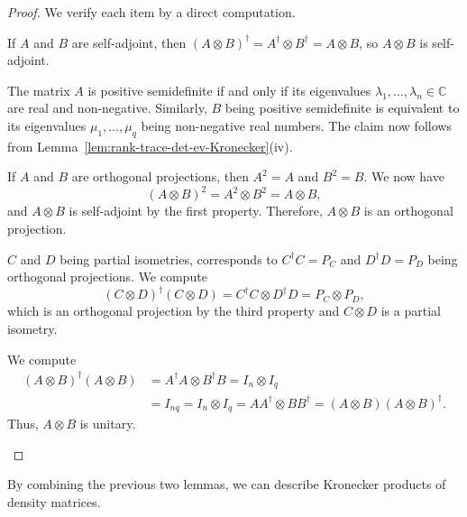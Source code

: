 \documentclass[a4paper,oneside, 12pt]{amsart}
\begin{document}
\begin{proof}
  We verify each item by a direct computation.
\begin{thmlist}
  \item If \( A \) and \( B \) are self-adjoint, then \( (A \otimes B)^\dagger = A^\dagger \otimes B^\dagger = A \otimes B \), so \( A \otimes B \) is self-adjoint.

  \item The matrix \( A \) is  positive semidefinite if and only if its eigenvalues \(\lambda_{1}, \dots , \lambda_{n} \in \mathbb{C}\) are real and non-negative.
  Similarly, \(B\) being positive semidefinite is equivalent to its eigenvalues \(\mu_{1}, \dots , \mu_{q}\) being non-negative real numbers.
  The claim now follows from Lemma~\ref{lem:rank-trace-det-ev-Kronecker}(iv).
  \item If \( A \) and \( B \) are orthogonal projections, then \( A^2 = A \) and \( B^2 = B \).
  We now have
  \begin{equation*}
    (A \otimes B)^2 = A^2 \otimes B^2 = A \otimes B,
  \end{equation*}
  and \( A \otimes B \) is self-adjoint by the first property.
  Therefore, \( A \otimes B \) is an orthogonal projection.
  \item \( C \) and \( D \) being partial isometries, corresponds to  \( C^\dagger C = P_C \) and \( D^\dagger D = P_D \) being orthogonal projections.
  We compute
  \begin{equation*}
    (C \otimes D)^\dagger (C \otimes D) = C^\dagger C \otimes D^\dagger D = P_C \otimes P_D,
  \end{equation*}
  which is an orthogonal projection by the third property and \(C\otimes D\) is a partial isometry.
  \item We compute
  \begin{align*}
    (A \otimes B)^\dagger (A \otimes B)
    & = A^\dagger A \otimes B^\dagger B
      = I_n \otimes I_q\\
    & = I_{nq}
      =  I_n \otimes I_q
      = A A^\dagger \otimes B B^\dagger
      = (A \otimes B)(A \otimes B)^\dagger.
  \end{align*}
  Thus, \( A \otimes B \) is unitary. \qedhere
\end{thmlist}
\end{proof}

By combining the previous two lemmas, we can describe Kronecker products of density matrices.
\end{document}
